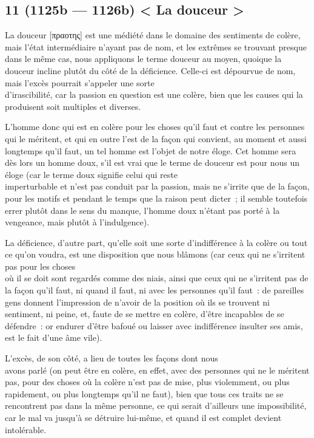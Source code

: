 \documentclass[french,twoside]{book} %
\begin{document}
\subsection[{11 (1125b — 1126b) < La douceur >}]{11 (1125b — 1126b) < La douceur >}
\noindent La douceur [πραοτης] est une médiété dans le domaine des sentiments de colère, mais l’état intermédiaire n’ayant pas de nom, et les extrêmes se trouvant presque dans le même cas, nous appliquons le terme douceur au moyen, quoique la douceur incline plutôt du côté de la déficience. Celle-ci est dépourvue de nom, mais l’excès pourrait s’appeler une sorte \\
d’irascibilité, car la passion en question est une colère, bien que les causes qui la produisent soit multiples et diverses.\par
L’homme donc qui est en colère pour les choses qu’il faut et contre les personnes qui le méritent, et qui en outre l’est de la façon qui convient, au moment et aussi longtemps qu’il faut, un tel homme est l’objet de notre éloge. Cet homme sera dès lors un homme doux, s’il est vrai que le terme de douceur est pour nous un éloge (car le terme doux signifie celui qui reste \\
imperturbable et n’est pas conduit par la passion, mais ne s’irrite que de la façon, pour les motifs et pendant le temps que  la raison peut dicter ; il semble toutefois errer plutôt dans le sens du manque, l’homme doux n’étant pas porté à la vengeance, mais plutôt à l’indulgence).\par
La déficience, d’autre part, qu’elle soit une sorte d’indifférence à la colère ou tout ce qu’on voudra, est une disposition que nous blâmons (car ceux qui ne s’irritent pas pour les choses \\
où il se doit sont regardés comme des niais, ainsi que ceux qui ne s’irritent pas de la façon qu’il faut, ni quand il faut, ni avec les personnes qu’il faut : de pareilles gens donnent l’impression de n’avoir de la position où ils se trouvent ni sentiment, ni peine, et, faute de se mettre en colère, d’être incapables de se défendre : or endurer d’être bafoué ou laisser avec indifférence insulter ses amis, est le fait d’une âme vile).\par
L’excès, de son côté, a lieu de toutes les façons dont nous \\
avons parlé (on peut être en colère, en effet, avec des personnes qui ne le méritent pas, pour des choses où la colère n’est pas de mise, plus violemment, ou plus rapidement, ou plus longtemps qu’il ne faut), bien que tous ces traits ne se rencontrent pas dans la même personne, ce qui serait d’ailleurs une impossibilité, car le mal va jusqu’à se détruire lui-même, et quand il est complet devient intolérable.\par
\end{document}

